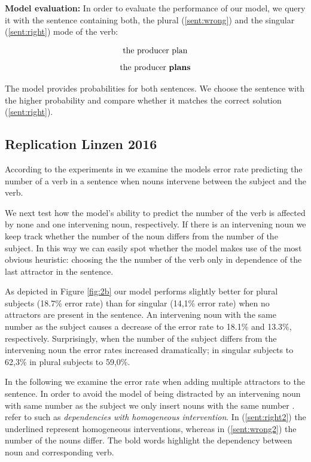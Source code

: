 \documentclass[twoside]{article}
\begin{document}
\begin{multicols}{2}
\textbf{Model evaluation:} In order to evaluate the performance of our model, we query it with the sentence containing both, the plural (\ref{sent:wrong}) and the singular (\ref{sent:right}) mode of the verb: 

\begin{equation}
	\label{sent:wrong}
	\textnormal{the producer plan}
\end{equation}
\begin{equation}
	\label{sent:right}
	\textnormal{the producer  \textbf{plans}}
\end{equation}




The model provides probabilities for both sentences. We choose the sentence with the higher probability and compare whether it matches the correct solution (\ref{sent:right}).

\subsection{Replication Linzen 2016}
\label{replication}
According to the experiments in \citep{Linzen2016} we examine the models error rate predicting the number of a verb in a sentence when nouns intervene between the subject and the verb. 

We next test how the model's ability to predict the number of the verb is affected by none and one intervening noun, respectively. If there is an intervening noun we keep track whether the number of the noun differs from the number of the subject. In this way we can easily spot whether the model makes use of the most obvious heuristic: choosing the the number of the verb only in dependence of the last attractor in the sentence.

As depicted in Figure \ref{fig:2b} our model performs slightly better for plural subjects (18.7\% error rate) than for singular (14,1\% error rate) when no attractors are present in the sentence. An intervening noun with the same number as the subject causes a decrease of the error rate to 18.1\% and 13.3\%, respectively. Surprisingly, when the number of the subject differs from the intervening noun the error rates increased dramatically; in singular subjects to 62,3\% in plural subjects to 59,0\%.

In the following we examine the error rate when adding multiple attractors to the sentence. In order to avoid the model of being distracted by an intervening noun with same number as the subject we only insert nouns with the same number . \citep{Linzen2016} refer to such as  \textit{ dependencies with homogeneous intervention}. In (\ref{sent:right2}) the underlined represent homogeneous interventions, whereas in (\ref{sent:wrong2}) the number of the nouns differ. The bold words highlight the dependency between noun and corresponding verb.


\end{multicols}
\end{document}
